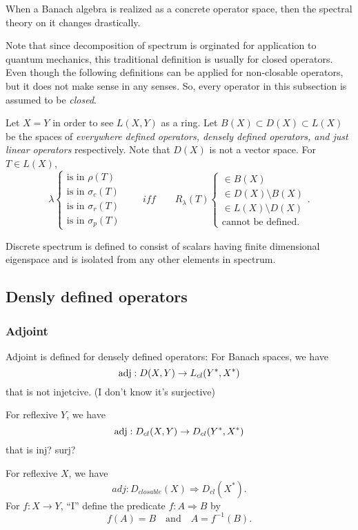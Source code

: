 \documentclass{../crs}
\begin{document}
When a Banach algebra is realized as a concrete operator space, then the spectral theory on it changes drastically.

Note that since decomposition of spectrum is orginated for application to quantum mechanics, this traditional definition is usually for closed operators.
Even though the following definitions can be applied for non-closable operators, but it does not make sense in any senses.
So, every operator in this subsection is assumed to be \emph{closed}.

Let $X=Y$ in order to see $L(X,Y)$ as a ring.
Let $B(X)\subset D(X)\subset L(X)$ be the spaces of \emph{everywhere defined operators, densely defined operators, and just linear operators} respectively.
Note that $D(X)$ is not a vector space.
For $T\in L(X)$,
\[\lambda\begin{cases}\text{is in }\rho(T)\\\text{is in }\sigma_c(T)\\\text{is in }\sigma_r(T)\\\text{is in }\sigma_p(T)\end{cases}\qquad\textit{iff}\qquad R_\lambda(T)\begin{cases}\in B(X)\\\in D(X)\setminus B(X)\\\in L(X)\setminus D(X)\\\text{cannot be defined.}\end{cases}.\]

Discrete spectrum is defined to consist of scalars having finite dimensional eigenspace and is isolated from any other elements in spectrum.
\clearpage
\subsection{Densly defined operators}
\subsubsection{Adjoint}
Adjoint is defined for densely defined operators:
For Banach spaces, we have
\[\adj:D(X,Y)\to L_{cl}(Y^*,X^*)\]
that is not injetcive. (I don't know it's surjective)

For reflexive $Y$, we have
\[\adj:D_{cl}(X,Y)\to D_{cl}(Y^*,X^*)\]
that is inj? surj?

For reflexive $X$, we have
\[adj:D_{closable}(X)\Rightarrow D_{cl}(X^*).\]
For $f:X\to Y$, ``I'' define the predicate $f:A\Rightarrow B$ by
\[f(A)=B\quad\text{and}\quad A=f^{-1}(B).\]
\end{document}
